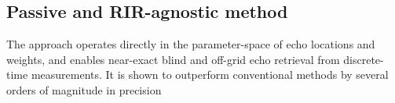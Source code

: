 \subsection{Passive and RIR-agnostic method}

The approach operates directly in the parameter-space of echo locations and weights, and enables near-exact blind and off-grid echo retrieval from discrete-time measurements. It is shown to outperform conventional methods by several orders of magnitude in precision





